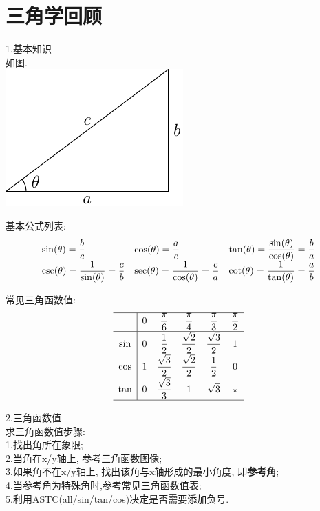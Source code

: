 \chapter{三角学回顾}
1.基本知识\\
如图.\\
\includegraphics{triangel.pdf}

基本公式列表:
\begin{equation*}
\begin{array}{l l l}
		\displaystyle\sin(\theta)=\frac{b}{c} & \displaystyle\cos(\theta)=\frac{a}{c} & \displaystyle\tan(\theta)=\frac{\sin(\theta)}{\cos(\theta)}=\frac{b}{a}\\
    \displaystyle\csc(\theta)=\frac{1}{\sin(\theta)}=\frac{c}{b} & \displaystyle\sec(\theta)=\frac{1}{\cos(\theta)}=\frac{c}{a} & \displaystyle\cot(\theta)=\frac{1}{\tan(\theta)}=\frac{a}{b}
\end{array}
\end{equation*}\vspace{2ex}

常见三角函数值:\\
\begin{equation*}
\begin{array}{>{\displaystyle}c|>{\displaystyle}c >{\displaystyle}c >{\displaystyle}c >{\displaystyle}c >{\displaystyle}c}
\hline
    & 0 & \frac{\pi}{6} & \frac{\pi}{4} & \frac{\pi}{3} & \frac{\pi}{2}\\[1ex]
\hline
    \sin & 0 & \frac{1}{2} & \frac{\sqrt{2}}{2} & \frac{\sqrt{3}}{2} & 1\\[1ex]
    \cos & 1 & \frac{\sqrt{3}}{2} & \frac{\sqrt{2}}{2} & \frac{1}{2} & 0\\[1ex]
    \tan & 0 & \frac{\sqrt{3}}{3} & 1 & \sqrt{3} & \star\\[1ex]
\hline
\end{array}
\end{equation*}\vspace{4ex}

2.三角函数值\\
求三角函数值步骤:\\
1.找出角所在象限;\\
2.当角在x/y轴上, 参考三角函数图像;\\
3.如果角不在x/y轴上, 找出该角与x轴形成的最小角度, 即\textbf{参考角};\\
4.当参考角为特殊角时,参考常见三角函数值表;\\
5.利用ASTC(all/sin/tan/cos)决定是否需要添加负号.\\

